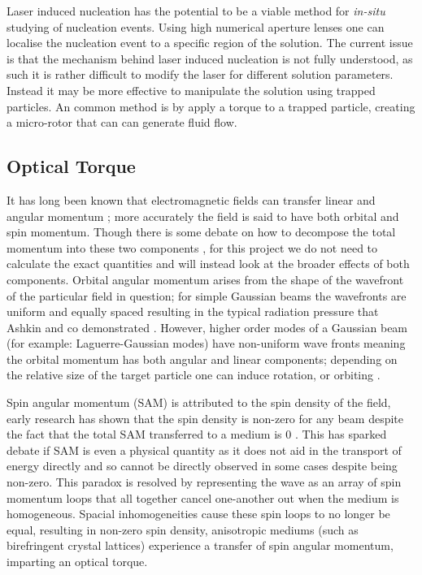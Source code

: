 Laser induced nucleation has the potential to be a viable method for 
\textit{in-situ} studying of nucleation events. Using high numerical 
aperture lenses one can localise the nucleation event to a specific 
region of the solution. The current issue is that the mechanism behind
laser induced nucleation is not fully understood, as such it is rather
difficult to modify the laser for different solution parameters. Instead
it may be more effective to manipulate the solution using trapped particles.
An common method is by apply a torque to a trapped particle, creating 
a micro-rotor that can can generate fluid flow.

\subsection{Optical Torque}
It has long been known that electromagnetic fields can transfer linear and
angular momentum \cite{Beth1936MechanicalDA}; more accurately the field 
is said to have both orbital and spin momentum. Though there is some 
debate on how to decompose the total momentum into these two components 
\cite{Bruce2020, Svak2018}, for this project we do not need to calculate 
the exact quantities and will instead look at the broader effects of both 
components. Orbital angular momentum arises from the shape of the wavefront 
of the particular field in question; for simple Gaussian beams the wavefronts 
are uniform and equally spaced resulting in the typical radiation pressure 
that Ashkin and co demonstrated \cite{Ashkin1980}. However, higher order 
modes of a Gaussian beam (for example: Laguerre-Gaussian modes) have 
non-uniform wave fronts meaning the orbital momentum has both angular and
linear components; depending on the relative size of the target particle 
one can induce rotation, or orbiting \cite{Bruce2020, Courtial2000}. 

Spin angular momentum (SAM) is attributed to the spin density of the field, 
early research has shown that the spin density is non-zero for any beam despite
the fact that the total SAM transferred to a medium is 0 \cite{Svak2018, 
Bliokh2014}. This has sparked debate if SAM is even a physical quantity as 
it does not aid in the transport of energy directly \cite{Bliokh2014} and 
so cannot be directly observed in some cases despite being non-zero. This 
paradox is resolved by representing the wave as an array of spin momentum 
loops that all together cancel one-another out when the medium is homogeneous.
Spacial inhomogeneities cause these spin loops to no longer be equal, resulting
in non-zero spin density, anisotropic mediums (such as birefringent crystal 
lattices) experience a transfer of spin angular momentum, imparting an optical
torque.

